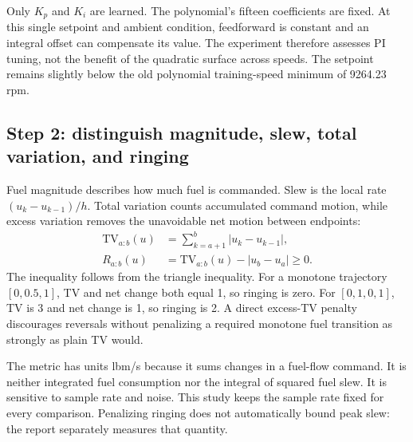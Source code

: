 Only $K_p$ and $K_i$ are learned. The polynomial's fifteen coefficients are fixed. At this single setpoint and ambient condition, feedforward is constant and an integral offset can compensate its value. The experiment therefore assesses PI tuning, not the benefit of the quadratic surface across speeds. The setpoint remains slightly below the old polynomial training-speed minimum of 9264.23 rpm.

\subsection{Step 2: distinguish magnitude, slew, total variation, and ringing}
Fuel magnitude describes how much fuel is commanded. Slew is the local rate $(u_k-u_{k-1})/h$. Total variation counts accumulated command motion, while excess variation removes the unavoidable net motion between endpoints:
\begin{align}
\mathrm{TV}_{a:b}(u)&=\sum_{k=a+1}^{b}|u_k-u_{k-1}|,\\
R_{a:b}(u)&=\mathrm{TV}_{a:b}(u)-|u_b-u_a|\ge0.
\end{align}
The inequality follows from the triangle inequality. For a monotone trajectory $[0,0.5,1]$, TV and net change both equal 1, so ringing is zero. For $[0,1,0,1]$, TV is 3 and net change is 1, so ringing is 2. A direct excess-TV penalty discourages reversals without penalizing a required monotone fuel transition as strongly as plain TV would.

The metric has units lbm/s because it sums changes in a fuel-flow command. It is neither integrated fuel consumption nor the integral of squared fuel slew. It is sensitive to sample rate and noise. This study keeps the sample rate fixed for every comparison. Penalizing ringing does not automatically bound peak slew: the report separately measures that quantity.

